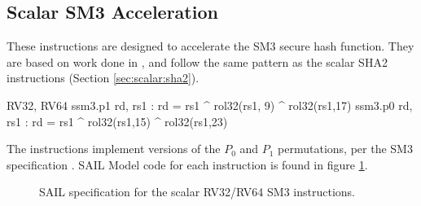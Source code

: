 
\newpage
\subsection{Scalar SM3 Acceleration}
\label{sec:scalar:sm3}

These instructions are designed to accelerate the SM3 secure
hash function\cite{ietf:sm3}.
They are based on work done in \cite{MJS:LWSHA:20}, and follow
the same pattern as the scalar SHA2 instructions
(Section \ref{sec:scalar:sha2}).

\begin{cryptoisa}
RV32, RV64
    ssm3.p1 rd, rs1 : rd = rs1 ^ rol32(rs1, 9) ^ rol32(rs1,17)
    ssm3.p0 rd, rs1 : rd = rs1 ^ rol32(rs1,15) ^ rol32(rs1,23)
\end{cryptoisa}

The instructions implement versions of the $P_0$ and $P_1$
permutations, per the SM3 specification \cite{ietf:sm3}.
SAIL Model code for each instruction is found in figure
\ref{fig:sail:sm3}.

\begin{figure}[h]

\caption{SAIL specification for the scalar RV32/RV64 SM3 instructions.}
\label{fig:sail:sm3}
\end{figure}
